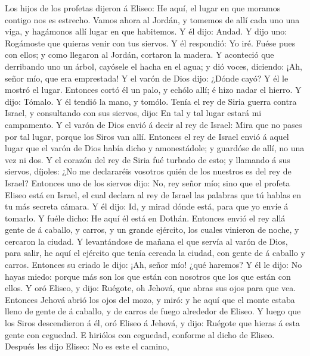 Los hijos de los profetas dijeron á Eliseo: He aquí, el
lugar en que moramos contigo nos es estrecho.  Vamos ahora
al Jordán, y tomemos de allí cada uno una viga, y hagámonos allí lugar
en que habitemos. Y él dijo: Andad.  Y dijo uno: Rogámoste
que quieras venir con tus siervos. Y él respondió: Yo iré.
 Fuése pues con ellos; y como llegaron al Jordán, cortaron
la madera.  Y aconteció que derribando uno un árbol,
cayósele el hacha en el agua; y dió voces, diciendo: ¡Ah, señor mío, que
era emprestada!  Y el varón de Dios dijo: ¿Dónde cayó? Y
él le mostró el lugar. Entonces cortó él un palo, y echólo allí; é hizo
nadar el hierro.  Y dijo: Tómalo. Y él tendió la mano, y
tomólo.  Tenía el rey de Siria guerra contra Israel, y
consultando con sus siervos, dijo: En tal y tal lugar estará mi
campamento.  Y el varón de Dios envió á decir al rey de
Israel: Mira que no pases por tal lugar, porque los Siros van allí.
 Entonces el rey de Israel envió á aquel lugar que el
varón de Dios había dicho y amonestádole; y guardóse de allí, no una vez
ni dos.  Y el corazón del rey de Siria fué turbado de
esto; y llamando á sus siervos, díjoles: ¿No me declararéis vosotros
quién de los nuestros es del rey de Israel?  Entonces uno
de los siervos dijo: No, rey señor mío; sino que el profeta Eliseo está
en Israel, el cual declara al rey de Israel las palabras que tú hablas
en tu más secreta cámara.  Y él dijo: Id, y mirad dónde
está, para que yo envíe á tomarlo. Y fuéle dicho: He aquí él está en
Dothán.  Entonces envió el rey allá gente de á caballo, y
carros, y un grande ejército, los cuales vinieron de noche, y cercaron
la ciudad.  Y levantándose de mañana el que servía al
varón de Dios, para salir, he aquí el ejército que tenía cercada la
ciudad, con gente de á caballo y carros. Entonces su criado le dijo:
¡Ah, señor mío! ¿qué haremos?  Y él le dijo: No hayas
miedo: porque más son los que están con nosotros que los que están con
ellos.  Y oró Eliseo, y dijo: Ruégote, oh Jehová, que
abras sus ojos para que vea. Entonces Jehová abrió los ojos del mozo, y
miró: y he aquí que el monte estaba lleno de gente de á caballo, y de
carros de fuego alrededor de Eliseo.  Y luego que los
Siros descendieron á él, oró Eliseo á Jehová, y dijo: Ruégote que hieras
á esta gente con ceguedad. E hiriólos con ceguedad, conforme al dicho de
Eliseo.  Después les dijo Eliseo: No es este el camino,
